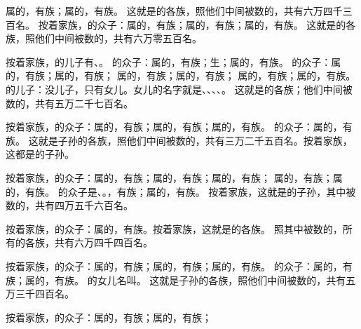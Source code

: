 {属{}的，有{}族；属{}的，有{}族。
这就是{}的各族，照他们中间被数的，共有六万四千三百名。
按着家族，{}的众子：属{}的，有{}族；属{}的，有{}族；属{}的，有{}族。
这就是{}的各族，照他们中间被数的，共有六万零五百名。
\par }{\PP {}按着家族，{}的儿子有{}、{}。
的众子：属{}的，有{}族；{}生{}；属{}的，有{}族。
的众子：属{}的，有{}族；属{}的，有{}族；
属{}的，有{}族；属{}的，有{}族；
属{}的，有{}族；属{}的，有{}族。
的儿子：{}没儿子，只有女儿。{}女儿的名字就是{}、{}、{}、{}、{}。
这就是{}的各族；他们中间被数的，共有五万二千七百名。
\par }{\PP {}按着家族，{}的众子：属{}的，有{}族；属{}的，有{}族；属{}的，有{}族。
的众子：属{}的，有{}族。
这就是{}子孙的各族，照他们中间被数的，共有三万二千五百名。按着家族，这都是{}的子孙。
\par }{\PP {}按着家族，{}的众子：属{}的，有{}族；属{}的，有{}族；属{}的，有{}族；
属{}的，有{}族；属{}的，有{}族。
的众子是{}、{}。{}，有{}族；属{}的，有{}族。
按着家族，这就是{}的子孙，其中被数的，共有四万五千六百名。
\par }{\PP {}按着家族，{}的众子：属{}的，有{}族。按着家族，这就是{}的各族。
照其中被数的，{}所有的各族，共有六万四千四百名。
\par }{\PP {}按着家族，{}的众子：属{}的，有{}族；属{}的，有{}族；属{}的，有{}族。
的众子：属{}的，有{}族；属{}的，有{}族。
的女儿名叫{}。
这就是{}子孙的各族，照他们中间被数的，共有五万三千四百名。
\par }{\PP {}按着家族，{}的众子：属{}的，有{}族；属{}的，有{}族；
}
